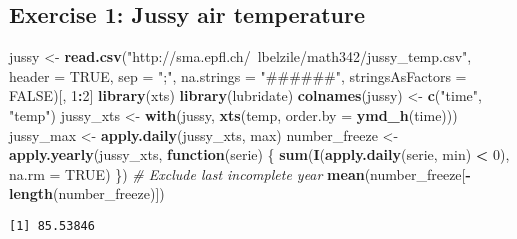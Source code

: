 \documentclass[]{book}
\newenvironment{Shaded}{\begin{snugshade}}{\end{snugshade}}
\newcommand{\CommentTok}[1]{\textcolor[rgb]{0.56,0.35,0.01}{\textit{#1}}}
\newcommand{\ControlFlowTok}[1]{\textcolor[rgb]{0.13,0.29,0.53}{\textbf{#1}}}
\newcommand{\DataTypeTok}[1]{\textcolor[rgb]{0.13,0.29,0.53}{#1}}
\newcommand{\DecValTok}[1]{\textcolor[rgb]{0.00,0.00,0.81}{#1}}
\newcommand{\KeywordTok}[1]{\textcolor[rgb]{0.13,0.29,0.53}{\textbf{#1}}}
\newcommand{\NormalTok}[1]{#1}
\newcommand{\OperatorTok}[1]{\textcolor[rgb]{0.81,0.36,0.00}{\textbf{#1}}}
\newcommand{\OtherTok}[1]{\textcolor[rgb]{0.56,0.35,0.01}{#1}}
\newcommand{\StringTok}[1]{\textcolor[rgb]{0.31,0.60,0.02}{#1}}
\begin{document}
\hypertarget{exercise-1-jussy-air-temperature-1}{%
\subsection{Exercise 1: Jussy air temperature}\label{exercise-1-jussy-air-temperature-1}}

\begin{Shaded}
\begin{Highlighting}[]
\NormalTok{jussy <-}\StringTok{ }\KeywordTok{read.csv}\NormalTok{(}\StringTok{"http://sma.epfl.ch/~lbelzile/math342/jussy_temp.csv"}\NormalTok{, }\DataTypeTok{header =} \OtherTok{TRUE}\NormalTok{, }
    \DataTypeTok{sep =} \StringTok{";"}\NormalTok{, }\DataTypeTok{na.strings =} \StringTok{"######"}\NormalTok{, }\DataTypeTok{stringsAsFactors =} \OtherTok{FALSE}\NormalTok{)[, }\DecValTok{1}\OperatorTok{:}\DecValTok{2}\NormalTok{]}
\KeywordTok{library}\NormalTok{(xts)}
\KeywordTok{library}\NormalTok{(lubridate)}
\KeywordTok{colnames}\NormalTok{(jussy) <-}\StringTok{ }\KeywordTok{c}\NormalTok{(}\StringTok{"time"}\NormalTok{, }\StringTok{"temp"}\NormalTok{)}
\NormalTok{jussy_xts <-}\StringTok{ }\KeywordTok{with}\NormalTok{(jussy, }\KeywordTok{xts}\NormalTok{(temp, }\DataTypeTok{order.by =} \KeywordTok{ymd_h}\NormalTok{(time)))}
\NormalTok{jussy_max <-}\StringTok{ }\KeywordTok{apply.daily}\NormalTok{(jussy_xts, max)}
\NormalTok{number_freeze <-}\StringTok{ }\KeywordTok{apply.yearly}\NormalTok{(jussy_xts, }\ControlFlowTok{function}\NormalTok{(serie) \{}
    \KeywordTok{sum}\NormalTok{(}\KeywordTok{I}\NormalTok{(}\KeywordTok{apply.daily}\NormalTok{(serie, min) }\OperatorTok{<}\StringTok{ }\DecValTok{0}\NormalTok{), }\DataTypeTok{na.rm =} \OtherTok{TRUE}\NormalTok{)}
\NormalTok{\})}
\CommentTok{# Exclude last incomplete year}
\KeywordTok{mean}\NormalTok{(number_freeze[}\OperatorTok{-}\KeywordTok{length}\NormalTok{(number_freeze)])}
\end{Highlighting}
\end{Shaded}

\begin{verbatim}
[1] 85.53846
\end{verbatim}

\begin{Shaded}
\end{Shaded}
\end{document}
